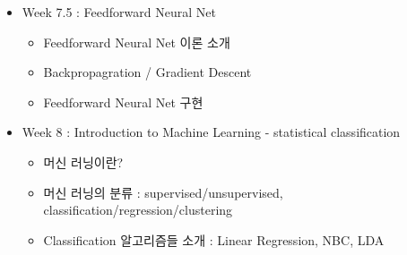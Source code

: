 \documentclass[11pt, a4paper]{article}
\begin{document}
\begin{center}
\begin{flushleft}
\begin{itemize}
\item Week 7.5 : Feedforward Neural Net
\begin{itemize} 
\item Feedforward Neural Net 이론 소개
\item Backpropagration / Gradient Descent 
\item Feedforward Neural Net 구현
\end{itemize}


\item Week 8 : Introduction to Machine Learning - statistical classification 

\begin{itemize} 
\item 머신 러닝이란? 
\item 머신 러닝의 분류 : supervised/unsupervised, classification/regression/clustering
\item Classification 알고리즘들 소개 : Linear Regression, NBC, LDA
\end{itemize}


\end{itemize}
\end{flushleft}
\end{center}





\end{document}

